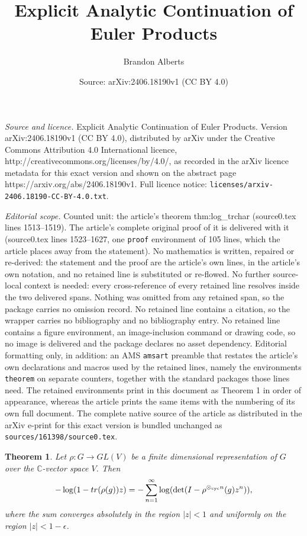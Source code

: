 \documentclass[10pt,a4paper]{amsart}
\title{Explicit Analytic Continuation of Euler Products}
\author{Brandon Alberts}
\date{Source: arXiv:2406.18190v1 (CC BY 4.0)}
\newtheorem{theorem}{Theorem}
\newcommand{\C}{\mathbb{C}}
\begin{document}
\maketitle

\noindent\emph{Source and licence.} Explicit Analytic Continuation of Euler Products. Version arXiv:2406.18190v1 (CC BY 4.0), distributed by arXiv under the Creative Commons Attribution 4.0 International licence, http://creativecommons.org/licenses/by/4.0/, as recorded in the arXiv licence metadata for this exact version and shown on the abstract page https://arxiv.org/abs/2406.18190v1. Full licence notice: \texttt{licenses/arxiv-2406.18190-CC-BY-4.0.txt}.\par\smallskip

\noindent\textit{Editorial scope.} Counted unit: the article's theorem thm:log\_trchar (source0.tex lines 1513--1519). The article's complete original proof of it is delivered with it (source0.tex lines 1523--1627, one \texttt{proof} environment of 105 lines, which the article places away from the statement). No mathematics is written, repaired or re-derived: the statement and the proof are the article's own lines, in the article's own notation, and no retained line is substituted or re-flowed.  No further source-local context is needed: every cross-reference of every retained line resolves inside the two delivered spans.  Nothing was omitted from any retained span, so the package carries no omission record.  No retained line contains a citation, so the wrapper carries no bibliography and no bibliography entry.  No retained line contains a figure environment, an image-inclusion command or drawing code, so no image is delivered and the package declares no asset dependency.  Editorial formatting only, in addition: an AMS \texttt{amsart} preamble that restates the article's own declarations and macros used by the retained lines, namely the environments \texttt{theorem} on separate counters, together with the standard packages those lines need.  The retained environments print in this document as Theorem 1 in order of appearance, whereas the article prints the same items with the numbering of its own full document.  The complete native source of the article as distributed in the arXiv e-print for this exact version is bundled unchanged as \texttt{sources/161398/source0.tex}.
\begin{theorem}\label{thm:log_trchar}
Let $\rho:G\to GL(V)$ be a finite dimensional representation of $G$ over the $\C$-vector space $V$. Then
\[
-\log( 1 - {\rm tr}(\rho(g))z ) = -\sum_{n=1}^{\infty}\log(\det(I-\rho^{\otimes_{\text{cyc}} n}(g)z^n)),
\]
where the sum converges absolutely in the region $|z|<1$ and uniformly on the region $|z|<1-\epsilon$.
\end{theorem}
\end{document}
